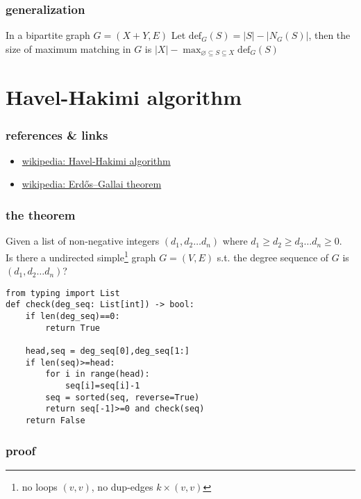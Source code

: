 \documentclass{article}
\begin{document}
\subsubsection{generalization}

In a bipartite graph $G=(X+Y,E)$
Let $\mathrm{def}_G(S)=|S|-|N_G(S)|$,
then the size of maximum matching in $G$ is $|X|-\max_{\varnothing\subseteq S\subseteq X}\mathrm{def}_G(S)$

\newpage
\section{Havel-Hakimi algorithm}

\subsubsection{references \& links}

\begin{itemize}
	\item \href{https://en.wikipedia.org/wiki/Havel-Hakimi_algorithm}{wikipedia: Havel-Hakimi algorithm}
	\item \href{https://en.wikipedia.org/wiki/Erdős–Gallai theorem}{wikipedia: Erdős–Gallai theorem}
\end{itemize}

\subsubsection{the theorem}

Given a list of non-negative integers $(d_1,d_2\ldots d_n)$ where $d_1\geq d_2\geq d_3\ldots d_n\geq 0$.\\
Is there a undirected simple\footnote{no loops $(v,v)$, no dup-edges $k\times (v,v)$} graph $G=(V,E)$ s.t. the degree sequence of $G$ is $(d_1,d_2\ldots d_n)$?

\begin{verbatim}
from typing import List
def check(deg_seq: List[int]) -> bool:
    if len(deg_seq)==0:
        return True

    head,seq = deg_seq[0],deg_seq[1:]
    if len(seq)>=head:
        for i in range(head):
            seq[i]=seq[i]-1
        seq = sorted(seq, reverse=True)
        return seq[-1]>=0 and check(seq)
    return False
\end{verbatim}

\subsubsection{proof}
\end{document}
